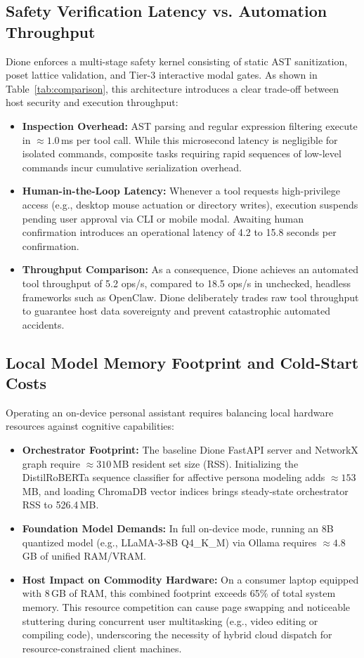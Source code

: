 \documentclass[conference,a4paper]{IEEEtran}
\begin{document}
\subsection{Safety Verification Latency vs. Automation Throughput}
Dione enforces a multi-stage safety kernel consisting of static AST sanitization, poset lattice validation, and Tier-3 interactive modal gates. As shown in Table~\ref{tab:comparison}, this architecture introduces a clear trade-off between host security and execution throughput:
\begin{itemize}
    \item \textbf{Inspection Overhead:} AST parsing and regular expression filtering execute in $\approx 1.0$\,ms per tool call. While this microsecond latency is negligible for isolated commands, composite tasks requiring rapid sequences of low-level commands incur cumulative serialization overhead.
    \item \textbf{Human-in-the-Loop Latency:} Whenever a tool requests high-privilege access (e.g., desktop mouse actuation or directory writes), execution suspends pending user approval via CLI or mobile modal. Awaiting human confirmation introduces an operational latency of 4.2 to 15.8 seconds per confirmation.
    \item \textbf{Throughput Comparison:} As a consequence, Dione achieves an automated tool throughput of 5.2 ops/s, compared to 18.5 ops/s in unchecked, headless frameworks such as OpenClaw. Dione deliberately trades raw tool throughput to guarantee host data sovereignty and prevent catastrophic automated accidents.
\end{itemize}

\subsection{Local Model Memory Footprint and Cold-Start Costs}
Operating an on-device personal assistant requires balancing local hardware resources against cognitive capabilities:
\begin{itemize}
    \item \textbf{Orchestrator Footprint:} The baseline Dione FastAPI server and NetworkX graph require $\approx 310$\,MB resident set size (RSS). Initializing the DistilRoBERTa sequence classifier for affective persona modeling adds $\approx 153$\,MB, and loading ChromaDB vector indices brings steady-state orchestrator RSS to 526.4\,MB.
    \item \textbf{Foundation Model Demands:} In full on-device mode, running an 8B quantized model (e.g., LLaMA-3-8B Q4\_K\_M) via Ollama requires $\approx 4.8$\,GB of unified RAM/VRAM.
    \item \textbf{Host Impact on Commodity Hardware:} On a consumer laptop equipped with 8\,GB of RAM, this combined footprint exceeds 65\% of total system memory. This resource competition can cause page swapping and noticeable stuttering during concurrent user multitasking (e.g., video editing or compiling code), underscoring the necessity of hybrid cloud dispatch for resource-constrained client machines.
\end{itemize}
\end{document}
